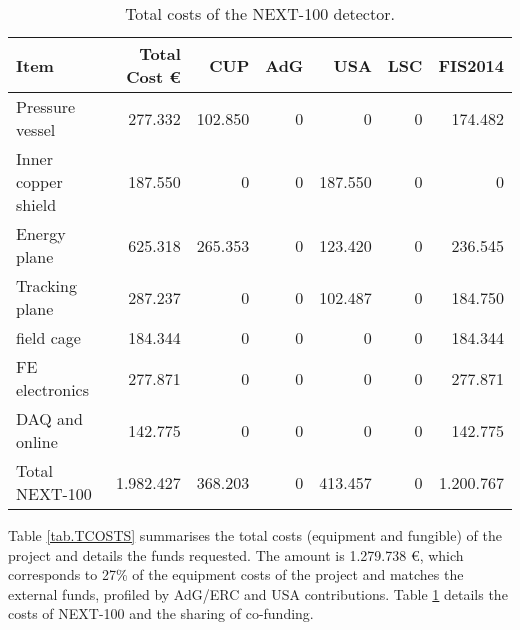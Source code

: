 %
\begin{table}[h!]
\begin{center}
\begin{tabular}{|l|r|r|r|r|r|r|}
\hline
 Item               & Total Cost \euro & CUP	 & AdG & USA     & LSC & FIS2014   \\
 \hline
Pressure vessel     &   277.332        & 102.850 &   0 &       0 &   0 &   174.482 \\ 
Inner copper shield &   187.550        &       0 &   0 & 187.550 &   0 & 	 0 \\ 
Energy plane	    &   625.318        & 265.353 &   0 & 123.420 &   0 &   236.545 \\ 
Tracking plane	    &   287.237        &       0 &   0 & 102.487 &   0 &   184.750 \\ 
field cage	    &   184.344        &       0 &   0 &       0 &   0 &   184.344 \\ 
FE electronics	    &   277.871        &       0 &   0 &       0 &   0 &   277.871 \\
DAQ and online      &   142.775        &       0 &   0 &       0 &   0 &   142.775 \\ 
Total NEXT-100	    & 1.982.427        & 368.203 &   0 & 413.457 &   0 & 1.200.767 \\ 
  \hline\hline
\end{tabular}  
\caption{Total costs of the NEXT-100 detector.}
\label{tab.TN100}
\end{center}
\end{table} 
 
Table \ref{tab.TCOSTS} summarises the total costs (equipment and fungible) of the project and details the funds requested. The amount is 1.279.738 \euro, which corresponds to 27\% of the equipment costs of the project and matches the external funds, profiled by AdG/ERC and USA contributions. Table \ref{tab.TN100} details the costs of NEXT-100 and the sharing of co-funding. 

